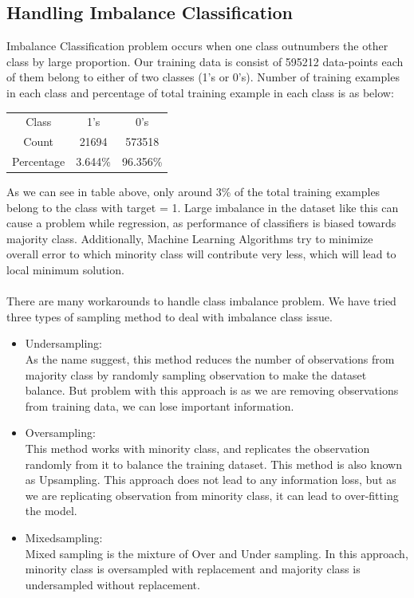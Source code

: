 \documentclass[fleqn,10pt]{SelfArx} %
\begin{document}
\subsection{Handling Imbalance Classification}
Imbalance Classification problem occurs when one class outnumbers the other class by large proportion. Our training data is consist of 595212 data-points each of them belong to either of two classes (1's or 0's). Number of training examples in each class and percentage of total training example in each class is as below:\\
\begin{center}
\begin{tabular}{| c | c | c |}
 Class & 1's & 0's \\ 
 Count & 21694 & 573518 \\  
 Percentage & 3.644\% & 96.356\%    
\end{tabular}
\end{center}

As we can see in table above, only around 3\% of the total training examples belong to the class with target = 1. Large imbalance in the dataset like this can cause a problem while regression, as performance of classifiers is biased towards majority class. Additionally, Machine Learning Algorithms try to minimize overall error to which minority class will contribute very less, which will lead to local minimum solution.\\
\paragraph{}
There are many workarounds to handle class imbalance problem. We have tried three types of sampling method to deal with imbalance class issue.
\begin{itemize}
    \item Undersampling:\\
    As the name suggest, this method reduces the number of observations from majority class by randomly sampling observation to make the dataset balance. But problem with this approach is as we are removing observations from training data, we can lose important information.
    \item Oversampling:\\
    This method works with minority class, and replicates the observation randomly from it to balance the training dataset. This method is also known as Upsampling. This approach does not lead to any information loss, but as we are replicating observation from minority class, it can lead to over-fitting the model.\\ 
    \item Mixedsampling:\\
    Mixed sampling is the mixture of Over and Under sampling. In this approach, minority class is oversampled with replacement and majority class is undersampled without replacement. 
\end{itemize}
\end{document}
